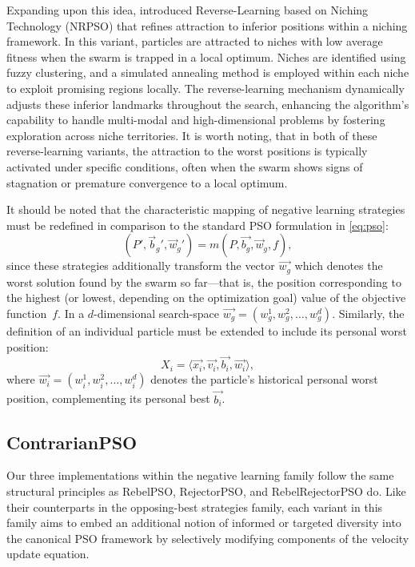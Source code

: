{Expanding upon this idea, \citet{dong2018reverselearning} introduced Reverse-Learning based on Niching Technology (NRPSO) that refines attraction to inferior positions within a niching framework. In this variant, particles are attracted to niches with low average fitness when the swarm is trapped in a local optimum. Niches are identified using fuzzy clustering, and a simulated annealing method is employed within each niche to exploit promising regions locally. The reverse-learning mechanism dynamically adjusts these inferior landmarks throughout the search, enhancing the algorithm’s capability to handle multi-modal and high-dimensional problems by fostering exploration across niche territories. It is worth noting, that in both of these reverse-learning variants, the attraction to the worst positions is typically activated under specific conditions, often when the swarm shows signs of stagnation or premature convergence to a local optimum. 

\enlargethispage{.1\baselineskip}
It should be noted that the characteristic mapping of negative learning strategies must be redefined in comparison to the standard PSO formulation in \eqref{eq:pso}:
\begin{equation}\label{eq:negative_pso}
(P', \vec{b}_g', \vec{w}_g') = m(P, \vec{b_g}, \vec{w}_g, f),
\end{equation}
since these strategies additionally transform the vector \(\vec{w_g}\) which denotes the worst solution found by the swarm so far—that is, the position corresponding to the highest (or lowest, depending on the optimization goal) value of the objective function~\(f\).
In a \(d\)-dimensional \gls{search-space} \(\vec{w_g} = (w_{g}^{1}, w_{g}^{2}, \dots, w_{g}^{d}) \). Similarly, the definition of an individual particle must be extended to include its personal worst position:
\begin{equation}\label{eq:particle_negative}
X_i = \langle \vec{x_i}, \vec{v_{i}}, \vec{b_i}, \vec{w_i} \rangle,
\end{equation}
where  
\(\vec{w_i} = (w_{i}^{1}, w_{i}^{2}, \dots, w_{i}^{d}) \) denotes the particle’s historical personal worst position, complementing its personal best $\vec{b_i}$.



\subsection{ContrarianPSO}

Our three implementations within the negative learning family follow the same structural principles as RebelPSO, RejectorPSO, and RebelRejectorPSO do. Like their counterparts in the opposing-best strategies family, each variant in this family aims to embed an additional notion of informed or targeted diversity into the canonical PSO framework by selectively modifying components of the velocity update equation.

}
